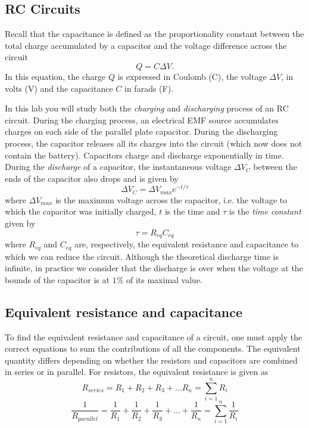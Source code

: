 \documentclass[12pt]{report}
\begin{document}
\subsection{RC Circuits}
Recall that the capacitance is defined as the proportionality constant between the total charge accumulated by a capacitor and the voltage difference across the circuit
\begin{equation}
Q = C \Delta V.
\end{equation}
In this equation, the charge $Q$ is expressed in Coulomb (C), the voltage $\Delta V$, in volts (V) and the capacitance $C$ in farads (F).

In this lab you will study both the \textit{charging} and \textit{discharging} process of an RC circuit. 
During the charging process, an electrical EMF source accumulates charges  on each side of the parallel plate capacitor.
During the discharging process, the capacitor releases all its charges into the circuit (which now does not contain the battery). 
Capacitors charge and discharge exponentially in time. 
During the \textit{discharge} of a capacitor, the instantaneous voltage $\Delta V_C$ between the ends of the capacitor also drops and is given by
\begin{equation}
\Delta V_C = \Delta V_{max} e^{-t/\tau}
\label{Eq:V-discharge}
\end{equation}
where $\Delta V_{max}$ is the maximum voltage across the capacitor, i.e. the voltage to which the capacitor was initially charged, $t$ is the time and $\tau$ is the \textit{time constant} given by
\begin{equation}
\tau = R_{eq} C_{eq}
\label{Eq:time-constant}
\end{equation}
where $R_{eq}$ and $C_{eq}$ are, respectively, the equivalent resistance and capacitance to which we can reduce the circuit. 
Although the theoretical discharge time is infinite, in practice we consider that the discharge is over when the voltage at the bounds of the capacitor is at $1\%$ of its maximal value. 

\subsection{Equivalent resistance and capacitance}
To find the equivalent resistance and capacitance of a circuit, one must apply the correct equations to sum the contributions of all the components. 
The equivalent quantity differs depending on whether the resistors and capacitors are combined in series or in parallel. For resistors, the equivalent resistance is given as
\begin{equation}
R_{series} = R_1 + R_2 + R_3 + ... R_n = \displaystyle \sum_{i=1}^n R_i
\end{equation}
\begin{equation}
\frac{1}{R_{parallel}} = \frac{1}{R_1} + \frac{1}{R_2} + \frac{1}{R_3} + ... + \frac{1}{R_n} = \displaystyle \sum_{i=1}^n \frac{1}{R_i}
\end{equation}
\end{document}
